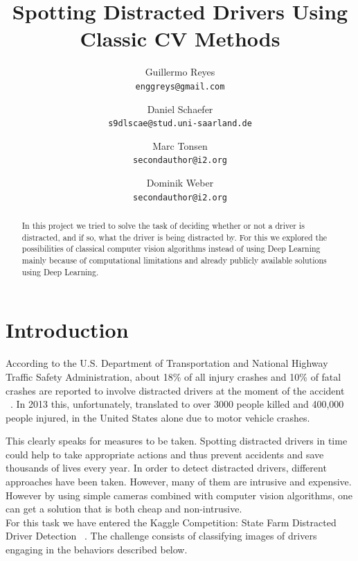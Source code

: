 \documentclass[10pt,twocolumn,letterpaper]{article}
\begin{document}
\title{Spotting Distracted Drivers Using Classic CV Methods}

\author{Guillermo Reyes\\
{\tt\small enggreys@gmail.com}
\and
Daniel Schaefer\\
{\tt\small s9dlscae@stud.uni-saarland.de}
\and
Marc Tonsen\\
{\tt\small secondauthor@i2.org}
\and
Dominik Weber\\
{\tt\small secondauthor@i2.org}
}

\maketitle

\begin{abstract}
   In this project we tried to solve the task of deciding whether or not a driver is distracted, and if so, what the driver is being distracted by. For this we explored the possibilities of classical computer vision algorithms instead of using Deep Learning mainly because of computational limitations and already publicly available solutions using Deep Learning.
\end{abstract}


\section{Introduction}


According to the U.S. Department of Transportation and National Highway Traffic Safety Administration, about 18\% of all injury crashes and 10\% of fatal crashes are reported to involve distracted drivers at the moment of the accident ~\cite{knuthwebsite}. In 2013 this, unfortunately, translated to over 3000 people killed and 400,000 people injured, in the United States alone due to motor vehicle crashes.

This clearly speaks for measures to be taken. Spotting distracted drivers in time could help to take appropriate actions and thus prevent accidents and save thousands of lives every year. In order to detect distracted drivers, different approaches have been taken. However, many of them are intrusive and expensive. However by using simple cameras combined with computer vision algorithms, one can get a solution that is both cheap and non-intrusive.\\

For this task we have entered the Kaggle Competition: State Farm Distracted Driver Detection ~\cite{Kaggle}. The challenge consists of classifying images of drivers engaging in the behaviors described below.
\end{document}
